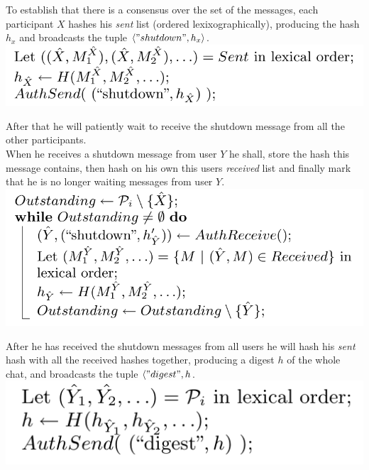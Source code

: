 \documentclass{beamer}
\begin{document}
\begin{frame}
To establish that there is a consensus over the set of the messages, each participant $X$ hashes his \emph{sent} list (ordered lexixographically), producing the hash $h_x$ and broadcasts the tuple $\langle "shutdown", h_x \rangle$.\\[0.5cm]

\includegraphics[scale=0.4]{sent_hash.png}
\end{frame}

\begin{frame}
After that he will patiently wait to receive the shutdown message from all the other participants.\\[0.5cm]

When he receives a shutdown message from user $Y$ he shall, store the hash this message contains, then hash on his own this users \emph{received} list  and finally mark that he is no longer waiting messages from user $Y$.\\[0.5cm]

\includegraphics[scale=0.4]{received_hashes.png}
\end{frame}

\begin{frame}
After he has received the shutdown messages from all users he will hash his \emph{sent} hash with all the received hashes together, producing a digest $h$ of the whole chat, and broadcasts the tuple $\langle "digest", h$.\\[0.5cm]

\includegraphics[scale=0.4]{chat_digest.png}
\end{frame}
\end{document}

